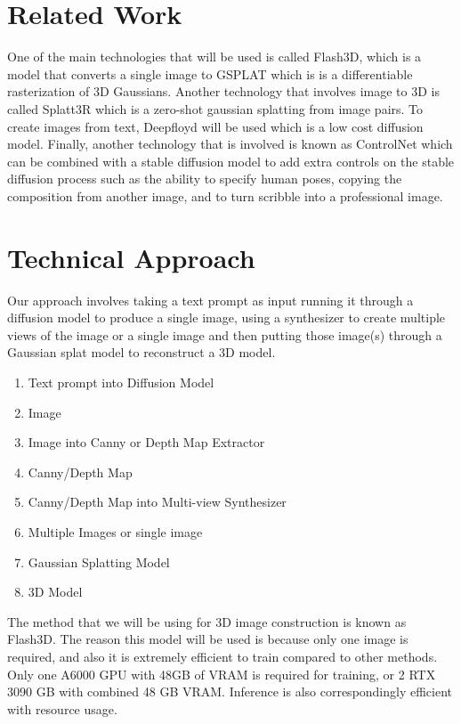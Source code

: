 \documentclass[10pt,twocolumn,letterpaper]{article}
\begin{document}
\section{Related Work}

One of the main technologies that will be used is called Flash3D, which  is a model that converts a single image to GSPLAT which is is a differentiable rasterization of 3D Gaussians. Another technology that involves image to 3D is called Splatt3R which is a zero-shot gaussian splatting from image pairs. To create images from text, Deepfloyd will be used which is a low cost diffusion model. Finally, another technology that is involved is known as ControlNet which can be combined with a stable diffusion model to add extra controls on the stable diffusion process such as the ability to specify human poses, copying the composition from another image, and to turn scribble into a professional image.


\section{Technical Approach}


Our approach involves taking a text prompt as input running it through a diffusion model to produce a single image, using a synthesizer to create multiple views of the image or a single image and then putting those image(s) through a Gaussian splat model to reconstruct a 3D model.

\begin{enumerate}
\item Text prompt into Diffusion Model
\item Image
\item Image into Canny or Depth Map Extractor
\item Canny/Depth Map
\item Canny/Depth Map into Multi-view Synthesizer
\item Multiple Images or single image
\item Gaussian Splatting Model
\item 3D Model
\end{enumerate}

The method that we will be using for 3D image construction is known as Flash3D. The reason this model will be used is because only one image is required, and also it is extremely efficient to train compared to other methods. Only one A6000 GPU with 48GB of VRAM is required for training, or 2 RTX 3090 GB with combined 48 GB VRAM. Inference is also correspondingly efficient with resource usage.
\end{document}
